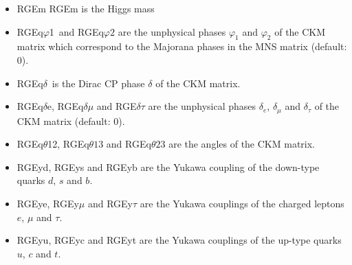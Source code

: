 \documentclass[10pt,a4paper,twoside]{scrartcl}
\begin{document}
\begin{itemize}
\item RGEm RGEm is the Higgs mass
  
\item RGEq$\varphi$1\ and RGEq$\varphi2$ are the unphysical phases $\varphi_1$ and $\varphi_2$ of the
 CKM matrix which correspond to the Majorana phases in the MNS matrix (default: $0$).
\item RGEq$\delta$\ is the Dirac CP phase $\delta$ of the CKM matrix.
\item RGEq$\delta$e, RGEq$\delta\mu$ and RGE$\delta\tau$ are the unphysical phases $\delta_e$,
$\delta_\mu$ and $\delta_\tau$ of the CKM matrix (default: $0$).
\item RGEq$\theta$12, RGEq$\theta13$ and RGEq$\theta23$ are the angles of the CKM matrix. 
\item RGEyd, RGEys and RGEyb are the Yukawa coupling of the down-type quarks $d$,
  $s$ and $b$.
\item RGEye, RGEy$\mu$ and RGEy$\tau$ are the Yukawa couplings of the charged
  leptons $e$, $\mu$ and $\tau$.
\item RGEyu, RGEyc and RGEyt are the Yukawa couplings of the up-type quarks $u$,
  $c$ and $t$.

\end{itemize}
\end{document}
